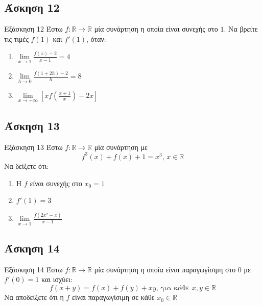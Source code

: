 \documentclass[greek]{beamer}
\begin{document}
\subsection{Άσκηση 12}
\begin{frame}[label=Άσκηση12]{Εξάσκηση 12}
 Έστω $f:\mathbb{R}\to\mathbb{R}$ μία συνάρτηση η οποία είναι συνεχής στο $1$. Να βρείτε τις τιμές $f(1)$ και $f'(1)$, όταν:
 \begin{enumerate}
  \item<1-> $\lim\limits_{x \to 1}{ \frac{f(x)-2}{x-1} }=4$
  \item<2-> $\lim\limits_{h \to 0}{ \frac{f(1+2h)-2}{h} }=8$
  \item<3-> $\lim\limits_{x \to +\infty}{ \left[ xf\left( \frac{x+1}{x} \right)-2x   \right]  }$
 \end{enumerate}

\end{frame}

\subsection{Άσκηση 13}
\begin{frame}[label=Άσκηση13]{Εξάσκηση 13}
 Έστω $f:\mathbb{R}\to\mathbb{R}$ μία συνάρτηση με
 $$f^3(x)+f(x)+1=x^3 \text{, } x\in\mathbb{R}$$
 Να δείξετε ότι:
 \begin{enumerate}
  \item<1-> Η $f$ είναι συνεχής στο $x_0=1$
  \item<2-> $f'(1)=3$
  \item<3-> $\lim\limits_{x \to 1}{ \frac{f(2x^2-x)}{x-1}  }$
 \end{enumerate}

\end{frame}

\subsection{Άσκηση 14}
\begin{frame}[label=Άσκηση14]{Εξάσκηση 14}
 Έστω $f:\mathbb{R}\to\mathbb{R}$ μία συνάρτηση η οποία είναι παραγωγίσιμη στο $0$ με $f'(0)=1$ και ισχύει:
 $$f(x+y)=f(x)+f(y)+xy \text{, για κάθε } x,y\in\mathbb{R}$$
 Να αποδείξετε ότι η $f$ είναι παραγωγίσιμη σε κάθε $x_0\in\mathbb{R}$

\end{frame}
\end{document}
